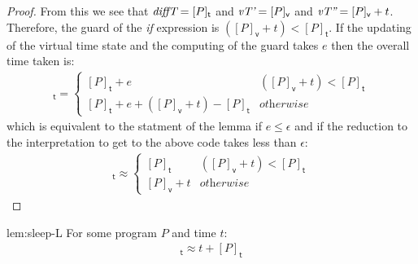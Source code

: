 \documentclass[preprint]{sigplanconf}
\renewcommand{\leq}{\leqslant}
\theoremstyle{definition}
\newcommand{\sleep}{\mathsf{sleep}\;}
\newcommand{\vtime}[1]{[#1]_{\mathsf{v}}}
\newcommand{\etime}[1]{[#1]_{\mathsf{t}}}
\begin{document}
\begin{proof}
From this we see that $\emph{diffT} = \etime{P}$ and $\emph{vT'} = \vtime{P}$ and 
 $\emph{vT''} = \vtime{P} + t$. Therefore, the guard of the 
\emph{if} expression is $(\vtime{P} + t) < \etime{P}$.
If the updating of the virtual time state and the computing of 
the guard takes $e$ then the overall time taken is:
\begin{align*}
\etime{P; \sleep{} t} = 
 \begin{cases}
   \etime{P} + e & (\vtime{P} + t) < \etime{P}  \\
   \etime{P} + e + (\vtime{P} + t) - \etime{P}  & \textit{otherwise}
 \end{cases}
\end{align*}
which is equivalent to the statment of the lemma if $e \leq \epsilon$
and if the reduction to the interpretation to get to the above code 
takes less than $\epsilon$:
\begin{align*}
\etime{P; \sleep{} t} \approx 
 \begin{cases}
   \etime{P} & (\vtime{P} + t) < \etime{P} \\
   \vtime{P} + t  &  \textit{otherwise}
 \end{cases}
\end{align*}
\end{proof}

\begin{replemma}{lem:sleep-L}
For some program $P$ and time $t$:
\begin{align*}
\etime{\sleep{} t; P} \approx t + \etime{P}
\end{align*}
\end{replemma}
\end{document}
